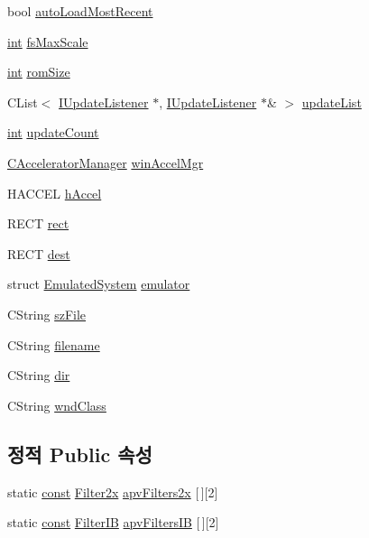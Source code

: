 \begin{DoxyCompactItemize}
bool \mbox{\hyperlink{class_v_b_a_aa523f068e8e2939fa2907a95f0881bde}{auto\+Load\+Most\+Recent}}
\item 
\mbox{\hyperlink{_util_8cpp_a0ef32aa8672df19503a49fab2d0c8071}{int}} \mbox{\hyperlink{class_v_b_a_a1a4cfe79496ea8a029bc591f33c489d6}{fs\+Max\+Scale}}
\item 
\mbox{\hyperlink{_util_8cpp_a0ef32aa8672df19503a49fab2d0c8071}{int}} \mbox{\hyperlink{class_v_b_a_ab7d47241ad4bc8c0e6717770797e6d57}{rom\+Size}}
\item 
C\+List$<$ \mbox{\hyperlink{class_i_update_listener}{I\+Update\+Listener}} $\ast$, \mbox{\hyperlink{class_i_update_listener}{I\+Update\+Listener}} $\ast$\& $>$ \mbox{\hyperlink{class_v_b_a_ad1bea05b3d5cd2fe5c3ea3c98db33ddc}{update\+List}}
\item 
\mbox{\hyperlink{_util_8cpp_a0ef32aa8672df19503a49fab2d0c8071}{int}} \mbox{\hyperlink{class_v_b_a_a61d96a23607a428ad97f74f4b750fcc2}{update\+Count}}
\item 
\mbox{\hyperlink{class_c_accelerator_manager}{C\+Accelerator\+Manager}} \mbox{\hyperlink{class_v_b_a_ad7ebce057dbde0ca88cee75e84721a89}{win\+Accel\+Mgr}}
\item 
H\+A\+C\+C\+EL \mbox{\hyperlink{class_v_b_a_a6ca8052bfc1574a9ef8ca4482563e1e3}{h\+Accel}}
\item 
R\+E\+CT \mbox{\hyperlink{class_v_b_a_a1303c6cf4f955c31d828de3fe77355f1}{rect}}
\item 
R\+E\+CT \mbox{\hyperlink{class_v_b_a_aed77fc82f818810cc87c470768c75e05}{dest}}
\item 
struct \mbox{\hyperlink{struct_emulated_system}{Emulated\+System}} \mbox{\hyperlink{class_v_b_a_ab40fc008c6714c3c8670eb8a9085a4a1}{emulator}}
\item 
C\+String \mbox{\hyperlink{class_v_b_a_ac85720ef4e00c5455be15266b7119045}{sz\+File}}
\item 
C\+String \mbox{\hyperlink{class_v_b_a_a66eee6b61ec8bee20f21164cb0c37d2d}{filename}}
\item 
C\+String \mbox{\hyperlink{class_v_b_a_a7177c0b51e84b91c6027ea73461c457e}{dir}}
\item 
C\+String \mbox{\hyperlink{class_v_b_a_acd3b584c09c85ec31168b1f7d1d8505e}{wnd\+Class}}
\end{DoxyCompactItemize}
\subsection*{정적 Public 속성}
\begin{DoxyCompactItemize}
\item 
static \mbox{\hyperlink{getopt1_8c_a2c212835823e3c54a8ab6d95c652660e}{const}} \mbox{\hyperlink{class_v_b_a_accd36b6c101a516c50cf8288976739c4}{Filter2x}} \mbox{\hyperlink{class_v_b_a_a99a7ccca7fb310a0a3d836f999a4b738}{apv\+Filters2x}} \mbox{[}$\,$\mbox{]}\mbox{[}2\mbox{]}
\item 
static \mbox{\hyperlink{getopt1_8c_a2c212835823e3c54a8ab6d95c652660e}{const}} \mbox{\hyperlink{class_v_b_a_a3269ee707f37ad255f2b7b0f20921158}{Filter\+IB}} \mbox{\hyperlink{class_v_b_a_a146f20875aaa489ae1b57d31918f25f8}{apv\+Filters\+IB}} \mbox{[}$\,$\mbox{]}\mbox{[}2\mbox{]}
\end{DoxyCompactItemize}


